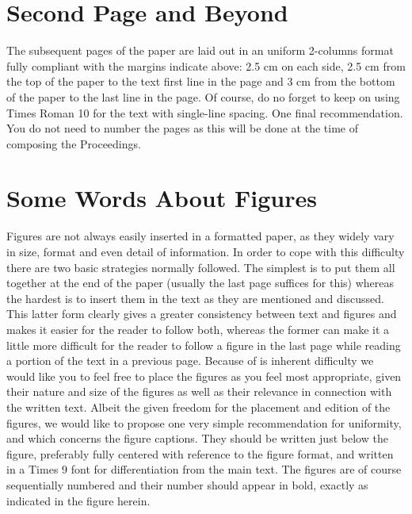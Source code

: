 \documentclass{IEEEconfA4}
\begin{document}
\section{Second Page and Beyond}

The subsequent pages of the paper are laid out in an uniform 2-columns format fully compliant with the margins indicate above: 2.5 cm on each side, 2.5 cm from the top of the paper to the text first line in the page and 3 cm from the bottom of the paper to the last line in the page. Of course, do no forget to keep on using Times Roman 10 for the text with single-line spacing.
One final recommendation. You do not need to number the pages as this will be done at the time of composing the Proceedings.

\section{Some Words About Figures}


Figures are not always easily inserted in a formatted paper, as they widely vary in size, format and even detail of information. In order to cope with this difficulty there are two basic strategies normally followed. The simplest is to put them all together at the end of the paper (usually the last page suffices for this) whereas the hardest is to insert them in the text as they are mentioned and discussed. This latter form clearly gives a greater consistency between text and figures and makes it easier for the reader to follow both, whereas the former can make it a little more difficult for the reader to follow a figure in the last page while reading a portion of the text in a previous page.
Because of is inherent difficulty we would like you to feel free to place the figures as you feel most appropriate, given their nature and size of the figures as well as their relevance in connection with the written text.
Albeit the given freedom for the placement and edition of the figures, we would like to propose one very simple recommendation for uniformity, and which concerns the figure captions. They should be written just below the figure, preferably fully centered with reference to the figure format, and written in  a Times 9 font for differentiation from the main text. The figures are of course sequentially numbered and their number should appear in bold, exactly as indicated in the figure herein.
\end{document}
